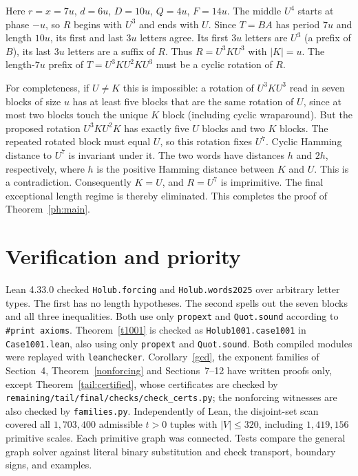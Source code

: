 \documentclass[10pt]{article}
\theoremstyle{remark}\newtheorem*{remark}{Remark}
\begin{document}
Here $r=x=7u$, $d=6u$, $D=10u$, $Q=4u$, $F=14u$.
The middle $U^4$ starts at phase $-u$, so $R$ begins with $U^3$
and ends with $U$. Since $T=BA$ has period $7u$ and length $10u$,
its first and last $3u$ letters agree. Its first $3u$ letters are
$U^3$ (a prefix of $B$), its last $3u$ letters are a suffix of $R$.
Thus $R=U^3 K U^3$ with $|K|=u$. The length-$7u$ prefix of
$T=U^3 K U^2 K U^3$ must be a cyclic rotation of $R$.

For completeness, if $U\ne K$ this is impossible: a rotation of
$U^3 K U^3$ read in seven blocks of size $u$ has at least five blocks
that are the same rotation of $U$, since at most two blocks touch
the unique $K$ block (including cyclic wraparound). But the proposed
rotation $U^3 K U^2 K$ has exactly five $U$ blocks and two $K$
blocks. The repeated rotated block must equal $U$, so this rotation
fixes $U^7$. Cyclic Hamming distance to $U^7$ is invariant under it.
The two words have distances $h$ and $2h$, respectively, where
$h$ is the positive Hamming distance between $K$ and $U$. This is a
contradiction. Consequently $K=U$, and $R=U^7$ is imprimitive.
The final exceptional length regime is thereby eliminated. This
completes the proof of Theorem~\ref{ph:main}.





\section{Verification and priority}
Lean 4.33.0 checked \texttt{Holub.forcing} and \texttt{Holub.words2025} over arbitrary letter types. The first has no length hypotheses. The second spells out the seven blocks and all three inequalities. Both use only \texttt{propext} and \texttt{Quot.sound} according to \texttt{\#print axioms}. Theorem~\ref{t1001} is checked as \texttt{Holub1001.case1001} in \texttt{Case1001.lean}, also using only \texttt{propext} and \texttt{Quot.sound}. Both compiled modules were replayed with \texttt{leanchecker}. Corollary~\ref{gcd}, the exponent families of Section~4, Theorem~\ref{nonforcing} and Sections~7--12 have written proofs only, except Theorem~\ref{tail:certified}, whose certificates are checked by \texttt{remaining/tail/final/checks/check\_certs.py}; the nonforcing witnesses are also checked by \texttt{families.py}. Independently of Lean, the disjoint-set scan covered all \(1{,}703{,}400\) admissible \(t>0\) tuples with \(|V|\le320\), including \(1{,}419{,}156\) primitive scales. Each primitive graph was connected. Tests compare the general graph solver against literal binary substitution and check transport, boundary signs, and examples.
\end{document}
